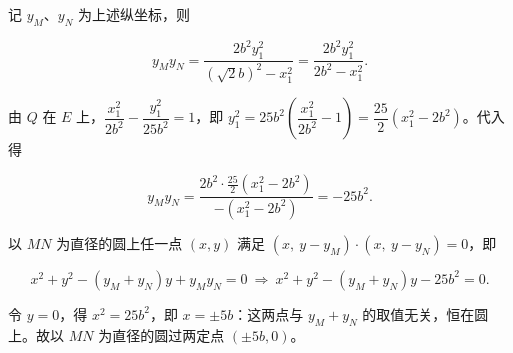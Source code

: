 \begin{answer}
记 $y_M$、$y_N$ 为上述纵坐标，则

\nopagebreak[4]
\[y_My_N=\frac{2b^2y_1^2}{(\sqrt2b)^2-x_1^2}=\frac{2b^2y_1^2}{2b^2-x_1^2}.\]

由 $Q$ 在 $E$ 上，$\dfrac{x_1^2}{2b^2}-\dfrac{y_1^2}{25b^2}=1$，即 $y_1^2=25b^2\left(\dfrac{x_1^2}{2b^2}-1\right)=\dfrac{25}{2}(x_1^2-2b^2)$。代入得

\nopagebreak[4]
\[y_My_N=\frac{2b^2\cdot\frac{25}{2}(x_1^2-2b^2)}{-(x_1^2-2b^2)}=-25b^2.\]

以 $MN$ 为直径的圆上任一点 $(x,y)$ 满足 $(x,\ y-y_M)\cdot(x,\ y-y_N)=0$，即

\nopagebreak[4]
\[x^2+y^2-(y_M+y_N)y+y_My_N=0\ \Longrightarrow\ x^2+y^2-(y_M+y_N)y-25b^2=0.\]

令 $y=0$，得 $x^2=25b^2$，即 $x=\pm5b$：这两点与 $y_M+y_N$ 的取值无关，恒在圆上。故以 $MN$ 为直径的圆过两定点 $(\pm5b,0)$。


\end{answer}
